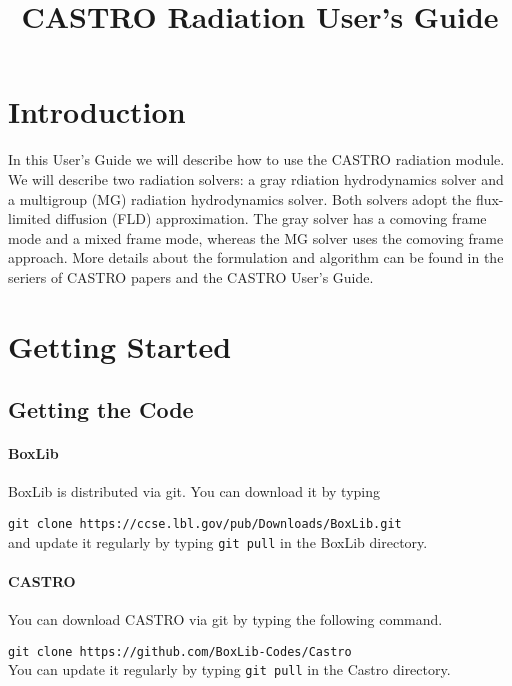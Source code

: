 \documentclass[11pt,letterpaper]{article}
\begin{document}
\title{CASTRO Radiation User's Guide}
\maketitle

\section{Introduction}

In this User's Guide we will describe how to use the CASTRO radiation
module.  We will describe two radiation solvers: a gray rdiation
hydrodynamics solver and a multigroup (MG) radiation hydrodynamics
solver.  Both solvers adopt the flux-limited diffusion (FLD)
approximation.  The gray solver has a comoving frame mode and a mixed
frame mode, whereas the MG solver uses the comoving frame approach.
More details about the formulation and algorithm can be found in the
seriers of CASTRO papers and the CASTRO User's Guide.

\section{Getting Started}

\subsection{Getting the Code}

\paragraph{BoxLib} BoxLib is distributed via git.  You can download it
by typing
\vspace{5pt}

\verb|git clone https://ccse.lbl.gov/pub/Downloads/BoxLib.git|\\[5pt]
and update it regularly by typing \verb|git pull| in the BoxLib
directory. 

\paragraph{CASTRO} You can download CASTRO via git by typing the
following command.
\vspace{5pt}

\verb|git clone https://github.com/BoxLib-Codes/Castro|\\[5pt] You can
update it regularly by typing \verb|git pull| in the Castro directory.
\end{document}
